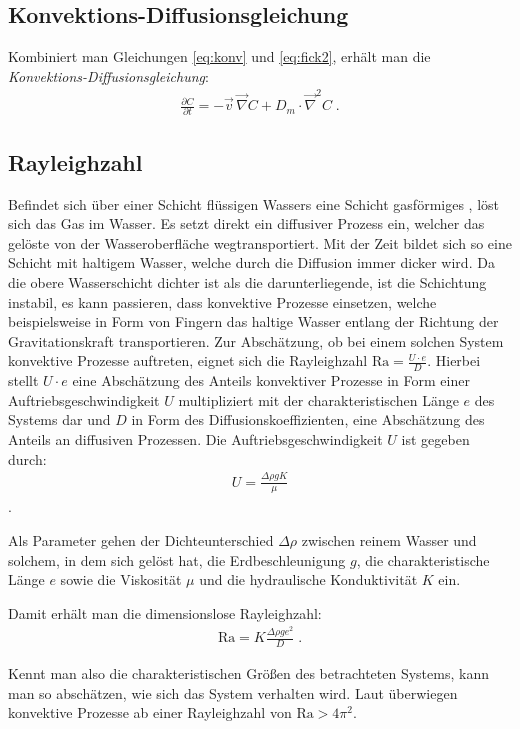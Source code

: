 \subsection{Konvektions-Diffusionsgleichung}
\label{sec:dispkon}
Kombiniert man Gleichungen \ref{eq:konv} und \ref{eq:fick2}, erhält man die \textit{Konvektions-Diffusionsgleichung}:
\begin{align}
 \frac{\partial C}{\partial t} = -\vec{v} \, \vec{\nabla}C + D_m \cdot \vec{\nabla}^2 C \; .
\end{align}


\subsection{Rayleighzahl}
\label{sec:ray}

Befindet sich über einer Schicht flüssigen Wassers eine Schicht gasförmiges \COTn, löst sich das Gas im Wasser. Es setzt direkt ein diffusiver Prozess ein, welcher das gelöste \COT von der Wasseroberfläche wegtransportiert. Mit der Zeit bildet sich so eine Schicht mit \COTm haltigem Wasser, welche durch die Diffusion immer dicker wird. Da die obere Wasserschicht dichter ist als die darunterliegende, ist die Schichtung instabil, es kann passieren, dass konvektive Prozesse einsetzen, welche beispielsweise in Form von Fingern das \COTm haltige Wasser entlang der Richtung der Gravitationskraft transportieren.
Zur Abschätzung, ob bei einem solchen System konvektive Prozesse auftreten, eignet sich die Rayleighzahl $\mathrm{Ra} = \frac{U \cdot e}{D}$. Hierbei stellt $U \cdot e$ eine Abschätzung des Anteils konvektiver Prozesse in Form einer Auftriebsgeschwindigkeit $U$ multipliziert mit der charakteristischen Länge $e$ des Systems dar und $D$ in Form des Diffusionskoeffizienten, eine Abschätzung des Anteils an diffusiven Prozessen. 
Die Auftriebsgeschwindigkeit $U$ ist gegeben durch:
\begin{align}
 U = \frac{\Delta\rho g K}{\mu}
 \label{eq:U}
\end{align}
\citep{fernandez}.

Als Parameter gehen der Dichteunterschied $\Delta\rho$ zwischen reinem Wasser und solchem, in dem sich \COT gelöst hat, die Erdbeschleunigung $g$, die charakteristische Länge $e$ sowie die Viskosität $\mu$ und die hydraulische Konduktivität $K$ ein.

Damit erhält man die dimensionslose Rayleighzahl:
\begin{align}
 \mathrm{Ra} = K\frac{\Delta\rho g e^2}{D} \; .
 \label{eq:Ra}
\end{align}

Kennt man also die charakteristischen Größen des betrachteten Systems, kann man so abschätzen, wie sich das System verhalten wird. Laut \cite{kneafsy} überwiegen konvektive Prozesse ab einer Rayleighzahl von \mbox{$\mathrm{Ra} > 4\pi^2$}.
